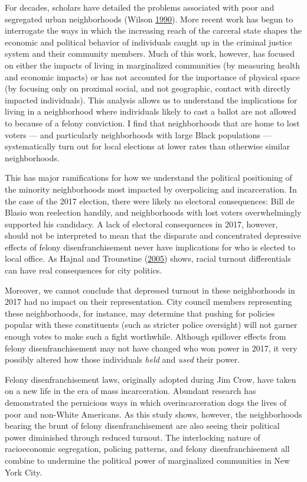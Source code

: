 \documentclass[
  12pt,
]{article}
\begin{document}
For decades, scholars have detailed the problems associated with poor and segregated urban neighborhoods (Wilson \protect\hyperlink{ref-Wilson1990}{1990}). More recent work has begun to interrogate the ways in which the increasing reach of the carceral state shapes the economic and political behavior of individuals caught up in the criminal justice system and their community members. Much of this work, however, has focused on either the impacts of living in marginalized communities (by measuring health and economic impacts) or has not accounted for the importance of physical space (by focusing only on proximal social, and not geographic, contact with directly impacted individuals). This analysis allows us to understand the implications for living in a neighborhood where individuals likely to cast a ballot are not allowed to because of a felony conviction. I find that neighborhoods that are home to lost voters --- and particularly neighborhoods with large Black populations --- systematically turn out for local elections at lower rates than otherwise similar neighborhoods.

This has major ramifications for how we understand the political positioning of the minority neighborhoods most impacted by overpolicing and incarceration. In the case of the 2017 election, there were likely no electoral consequences: Bill de Blasio won reelection handily, and neighborhoods with lost voters overwhelmingly supported his candidacy. A lack of electoral consequences in 2017, however, should not be interpreted to mean that the disparate and concentrated depressive effects of felony disenfranchisement never have implications for who is elected to local office. As Hajnal and Trounstine (\protect\hyperlink{ref-Hajnal2005}{2005}) shows, racial turnout differentials can have real consequences for city politics.

Moreover, we cannot conclude that depressed turnout in these neighborhoods in 2017 had no impact on their representation. City council members representing these neighborhoods, for instance, may determine that pushing for policies popular with these constituents (such as stricter police oversight) will not garner enough votes to make such a fight worthwhile. Although spillover effects from felony disenfranchisement may not have changed who won power in 2017, it very possibly altered how those individuals \emph{held} and \emph{used} their power.

Felony disenfranchisement laws, originally adopted during Jim Crow, have taken on a new life in the era of mass incarceration. Abundant research has demonstrated the pernicious ways in which overincarceration dogs the lives of poor and non-White Americans. As this study shows, however, the neighborhoods bearing the brunt of felony disenfranchisement are also seeing their political power diminished through reduced turnout. The interlocking nature of racioeconomic segregation, policing patterns, and felony disenfranchisement all combine to undermine the political power of marginalized communities in New York City.
\end{document}
